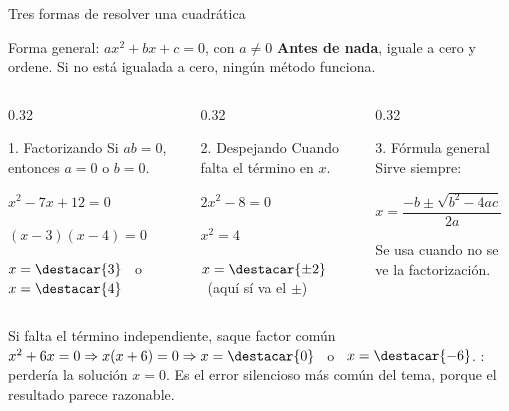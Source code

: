 \documentclass[aspectratio=169,10pt]{beamer}
\begin{document}
\begin{frame}{Tres formas de resolver una cuadrática}
  \scriptsize
  \begin{block}{Forma general: $ax^{2}+bx+c=0$, con $a\neq 0$}
    \tiny
    \textbf{Antes de nada}, iguale a cero y ordene. Si no está igualada a
    cero, ningún método funciona.
  \end{block}

  \vspace{0.04cm}
  \begin{columns}[T,onlytextwidth]
    \begin{column}{0.32\textwidth}
      \begin{exampleblock}{1. Factorizando}
        \tiny
        Si $ab=0$, entonces $a=0$ o $b=0$.

        \vspace{0.04cm}
        $x^{2}-7x+12=0$

        $(x-3)(x-4)=0$

        $x=\destacar{3}$ \ o \ $x=\destacar{4}$
      \end{exampleblock}
    \end{column}
    \begin{column}{0.32\textwidth}
      \begin{exampleblock}{2. Despejando}
        \tiny
        Cuando falta el término en $x$.

        \vspace{0.04cm}
        $2x^{2}-8=0$

        $x^{2}=4$

        $x=\destacar{\pm 2}$ \ {\color{uniGris}(aquí sí va el $\pm$)}
      \end{exampleblock}
    \end{column}
    \begin{column}{0.32\textwidth}
      \begin{exampleblock}{3. Fórmula general}
        \tiny
        Sirve siempre:

        \vspace{0.04cm}
        $x = \dfrac{-b\pm\sqrt{b^{2}-4ac}}{2a}$

        \vspace{0.04cm}
        {\color{uniGris}Se usa cuando no se ve la factorización.}
      \end{exampleblock}
    \end{column}
  \end{columns}

  \vspace{0.02cm}
  \begin{alertblock}{Si falta el término independiente, saque factor común}
    \tiny
    $x^{2}+6x = 0 \Rightarrow x(x+6)=0 \Rightarrow x=\destacar{0}$ \ o \
    $x=\destacar{-6}$. \quad
    : perdería la solución $x=0$. Es el error
    silencioso más común del tema, porque el resultado parece razonable.
  \end{alertblock}
\end{frame}
\end{document}
